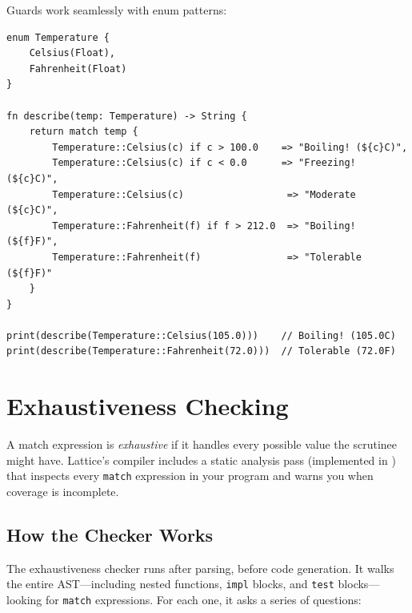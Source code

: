 Guards work seamlessly with enum patterns:

\begin{lstlisting}[language=Lattice, caption={Guards on enum patterns}]
enum Temperature {
    Celsius(Float),
    Fahrenheit(Float)
}

fn describe(temp: Temperature) -> String {
    return match temp {
        Temperature::Celsius(c) if c > 100.0    => "Boiling! (${c}C)",
        Temperature::Celsius(c) if c < 0.0      => "Freezing! (${c}C)",
        Temperature::Celsius(c)                  => "Moderate (${c}C)",
        Temperature::Fahrenheit(f) if f > 212.0  => "Boiling! (${f}F)",
        Temperature::Fahrenheit(f)               => "Tolerable (${f}F)"
    }
}

print(describe(Temperature::Celsius(105.0)))    // Boiling! (105.0C)
print(describe(Temperature::Fahrenheit(72.0)))  // Tolerable (72.0F)
\end{lstlisting}

\section{Exhaustiveness Checking}\label{sec:exhaustiveness}

A match expression is \emph{exhaustive} if it handles every possible value the scrutinee might have. Lattice's compiler includes a static analysis pass (implemented in ) that inspects every \lstinline|match| expression in your program and warns you when coverage is incomplete.

\subsection{How the Checker Works}\label{sec:checker-mechanics}

The exhaustiveness checker runs after parsing, before code generation. It walks the entire AST---including nested functions, \lstinline|impl| blocks, and \lstinline|test| blocks---looking for \lstinline|match| expressions. For each one, it asks a series of questions:

